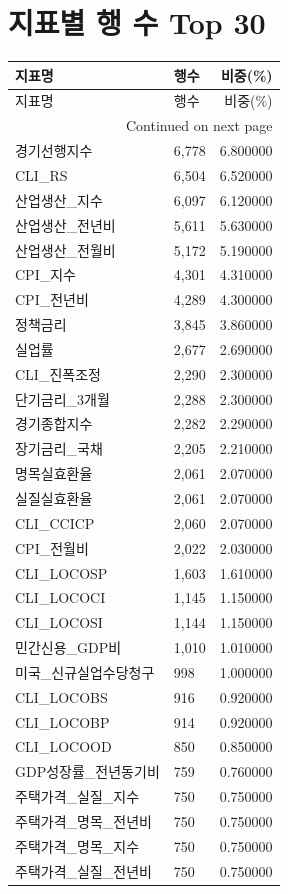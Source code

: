 \documentclass[11pt,a4paper]{article}
\begin{document}
\section{지표별 행 수 Top 30}
\begin{longtable}{llr}
\toprule
지표명 & 행수 & 비중(\%) \\
\midrule
\endfirsthead
\toprule
지표명 & 행수 & 비중(\%) \\
\midrule
\endhead
\midrule
\multicolumn{3}{r}{Continued on next page} \\
\midrule
\endfoot
\bottomrule
\endlastfoot
경기선행지수 & 6,778 & 6.800000 \\
CLI\_RS & 6,504 & 6.520000 \\
산업생산\_지수 & 6,097 & 6.120000 \\
산업생산\_전년비 & 5,611 & 5.630000 \\
산업생산\_전월비 & 5,172 & 5.190000 \\
CPI\_지수 & 4,301 & 4.310000 \\
CPI\_전년비 & 4,289 & 4.300000 \\
정책금리 & 3,845 & 3.860000 \\
실업률 & 2,677 & 2.690000 \\
CLI\_진폭조정 & 2,290 & 2.300000 \\
단기금리\_3개월 & 2,288 & 2.300000 \\
경기종합지수 & 2,282 & 2.290000 \\
장기금리\_국채 & 2,205 & 2.210000 \\
명목실효환율 & 2,061 & 2.070000 \\
실질실효환율 & 2,061 & 2.070000 \\
CLI\_CCICP & 2,060 & 2.070000 \\
CPI\_전월비 & 2,022 & 2.030000 \\
CLI\_LOCOSP & 1,603 & 1.610000 \\
CLI\_LOCOCI & 1,145 & 1.150000 \\
CLI\_LOCOSI & 1,144 & 1.150000 \\
민간신용\_GDP비 & 1,010 & 1.010000 \\
미국\_신규실업수당청구 & 998 & 1.000000 \\
CLI\_LOCOBS & 916 & 0.920000 \\
CLI\_LOCOBP & 914 & 0.920000 \\
CLI\_LOCOOD & 850 & 0.850000 \\
GDP성장률\_전년동기비 & 759 & 0.760000 \\
주택가격\_실질\_지수 & 750 & 0.750000 \\
주택가격\_명목\_전년비 & 750 & 0.750000 \\
주택가격\_명목\_지수 & 750 & 0.750000 \\
주택가격\_실질\_전년비 & 750 & 0.750000 \\
\end{longtable}
\end{document}
